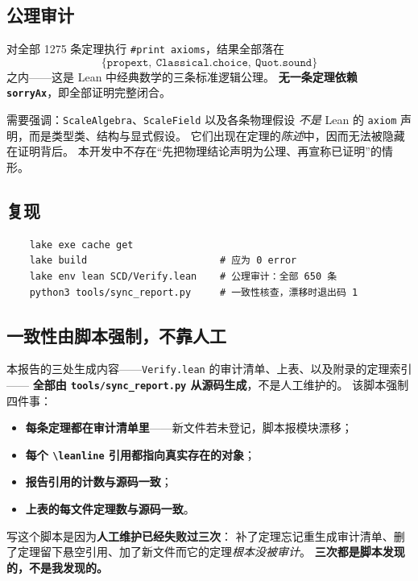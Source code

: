 \documentclass[11pt,a4paper]{article}
\theoremstyle{sudef}
\begin{document}
\subsection{公理审计}

对全部 1275 条定理执行 \texttt{\#print axioms}，结果全部落在
\[
\{\texttt{propext},\ \texttt{Classical.choice},\ \texttt{Quot.sound}\}
\]
之内——这是 Lean 中经典数学的三条标准逻辑公理。
\textbf{无一条定理依赖 \texttt{sorryAx}}，即全部证明完整闭合。

需要强调：\texttt{ScaleAlgebra}、\texttt{ScaleField} 以及各条物理假设
\emph{不是} Lean 的 \texttt{axiom} 声明，而是类型类、结构与显式假设。
它们出现在定理的\emph{陈述}中，因而无法被隐藏在证明背后。
本开发中不存在“先把物理结论声明为公理、再宣称已证明”的情形。

\subsection{复现}

\begin{verbatim}
    lake exe cache get
    lake build                       # 应为 0 error
    lake env lean SCD/Verify.lean    # 公理审计：全部 650 条
    python3 tools/sync_report.py     # 一致性核查，漂移时退出码 1
\end{verbatim}

\subsection{一致性由脚本强制，不靠人工}

本报告的三处生成内容——\texttt{Verify.lean} 的审计清单、上表、以及附录的定理索引——
\textbf{全部由 \texttt{tools/sync\_report.py} 从源码生成}，不是人工维护的。
该脚本强制四件事：

\begin{itemize}[leftmargin=1.6em,itemsep=2pt]
\item \textbf{每条定理都在审计清单里}——新文件若未登记，脚本报模块漂移；
\item \textbf{每个 \texttt{\textbackslash leanline} 引用都指向真实存在的对象}；
\item \textbf{报告引用的计数与源码一致}；
\item \textbf{上表的每文件定理数与源码一致}。
\end{itemize}

\begin{mdframed}[linecolor=axcol,linewidth=1pt,backgroundcolor=axcol!5]
写这个脚本是因为\textbf{人工维护已经失败过三次}：
补了定理忘记重生成审计清单、删了定理留下悬空引用、加了新文件而它的定理\emph{根本没被审计}。
\textbf{三次都是脚本发现的，不是我发现的。}
\end{mdframed}
\end{document}
